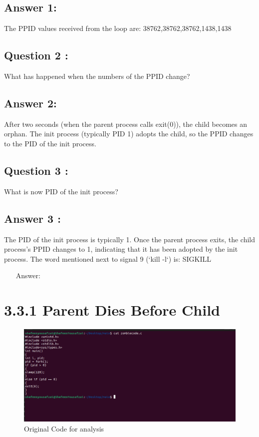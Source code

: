 \documentclass[12pt]{article}
\begin{document}
\subsection{Answer 1:}
The PPID values received from the loop are: 
   38762,38762,38762,1438,1438
 

\subsection{Question 2 :}
What has happened when the numbers of the PPID change?
\subsection{Answer 2: }
After two seconds (when the parent process calls exit(0)), the child becomes an orphan. The init process (typically PID 1) adopts the child, so the PPID changes to the PID of the init process.
\subsection{Question 3 :}
What is now PID of the init process?
\subsection{Answer 3 :}
The PID of the init process is typically 1. Once the parent process exits, the child process's PPID changes to 1, indicating that it has been adopted by the init process.
The word mentioned next to signal 9 (`kill -l`) is: SIGKILL
\begin{itemize}
    \item [Answer:]
\end{itemize}

\section{3.3.1 Parent Dies Before Child}
\begin{figure}[H]
        \centering
        \includegraphics[width=\textwidth]{sadsada.png}
        \caption{Original Code for analysis}
        \label{fig:enter-label}
    \end{figure}
\end{document}

